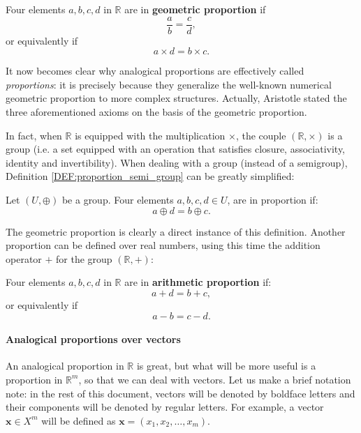 \begin{definition}
  Four elements $a, b, c, d$ in $\mathbb{R}$ are in \textbf{geometric
  proportion} if
  $$\frac{a}{b} = \frac{c}{d},$$
  or equivalently if
  $$a\times d = b\times c.$$
\end{definition}

It now becomes clear why analogical proportions are effectively called
\textit{proportions}: it is precisely because they generalize the well-known
numerical geometric proportion to more complex structures.  Actually, Aristotle
stated the three aforementioned axioms on the basis of the geometric
proportion.

In fact, when $\mathbb{R}$ is equipped with the multiplication $\times$, the
couple $(\mathbb{R}, \times)$ is a group (i.e. a set equipped with an operation
that satisfies  closure, associativity, identity and invertibility). When
dealing with a group (instead of a semigroup), Definition
\ref{DEF:proportion_semi_group} can be greatly simplified:

\begin{definition}
  \label{DEF:proportion_group}
Let $(U, \oplus)$ be a group.  Four elements $a, b, c, d \in U$, are in
  proportion if:
  $$a \oplus d = b \oplus c.$$
\end{definition}

The geometric proportion is clearly a direct instance of this definition.
Another proportion can be defined over real numbers, using this time the
addition operator $+$ for the group $(\mathbb{R}, +)$:

\begin{definition}
  Four elements $a, b, c, d$ in $\mathbb{R}$ are in \textbf{arithmetic
  proportion} if:
  $$a + d = b + c,$$
  or equivalently if
  $$a - b = c - d.$$
\end{definition}

\paragraph{Analogical proportions over vectors\\}

An analogical proportion in $\mathbb{R}$ is great, but what will be more useful
is a proportion in $\mathbb{R}^m$, so that we can deal with vectors.  Let us
make a brief notation note: in the rest of this document, vectors will be
denoted by boldface letters and their components will be denoted by regular
letters. For example, a vector $\mathbf{x} \in X^m$ will be defined as
$\mathbf{x} = (x_1, x_2, \dots, x_m)$.

